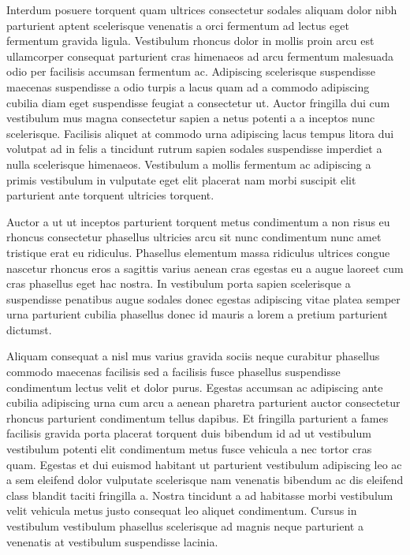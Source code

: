 \par
Interdum posuere torquent quam ultrices consectetur sodales aliquam dolor nibh parturient aptent scelerisque venenatis a orci fermentum ad lectus eget fermentum gravida ligula. Vestibulum rhoncus dolor in mollis proin arcu est ullamcorper consequat parturient cras himenaeos ad arcu fermentum malesuada odio per facilisis accumsan fermentum ac. Adipiscing scelerisque suspendisse maecenas suspendisse a odio turpis a lacus quam ad a commodo adipiscing cubilia diam eget suspendisse feugiat a consectetur ut. Auctor fringilla dui cum vestibulum mus magna consectetur sapien a netus potenti a a inceptos nunc scelerisque. Facilisis aliquet at commodo urna adipiscing lacus tempus litora dui volutpat ad in felis a tincidunt rutrum sapien sodales suspendisse imperdiet a nulla scelerisque himenaeos. Vestibulum a mollis fermentum ac adipiscing a primis vestibulum in vulputate eget elit placerat nam morbi suscipit elit parturient ante torquent ultricies torquent.
\par
Auctor a ut ut inceptos parturient torquent metus condimentum a non risus eu rhoncus consectetur phasellus ultricies arcu sit nunc condimentum nunc amet tristique erat eu ridiculus. Phasellus elementum massa ridiculus ultrices congue nascetur rhoncus eros a sagittis varius aenean cras egestas eu a augue laoreet cum cras phasellus eget hac nostra. In vestibulum porta sapien scelerisque a suspendisse penatibus augue sodales donec egestas adipiscing vitae platea semper urna parturient cubilia phasellus donec id mauris a lorem a pretium parturient dictumst.
\par
Aliquam consequat a nisl mus varius gravida sociis neque curabitur phasellus commodo maecenas facilisis sed a facilisis fusce phasellus suspendisse condimentum lectus velit et dolor purus. Egestas accumsan ac adipiscing ante cubilia adipiscing urna cum arcu a aenean pharetra parturient auctor consectetur rhoncus parturient condimentum tellus dapibus. Et fringilla parturient a fames facilisis gravida porta placerat torquent duis bibendum id ad ut vestibulum vestibulum potenti elit condimentum metus fusce vehicula a nec tortor cras quam. Egestas et dui euismod habitant ut parturient vestibulum adipiscing leo ac a sem eleifend dolor vulputate scelerisque nam venenatis bibendum ac dis eleifend class blandit taciti fringilla a. Nostra tincidunt a ad habitasse morbi vestibulum velit vehicula metus justo consequat leo aliquet condimentum. Cursus in vestibulum vestibulum phasellus scelerisque ad magnis neque parturient a venenatis at vestibulum suspendisse lacinia.
